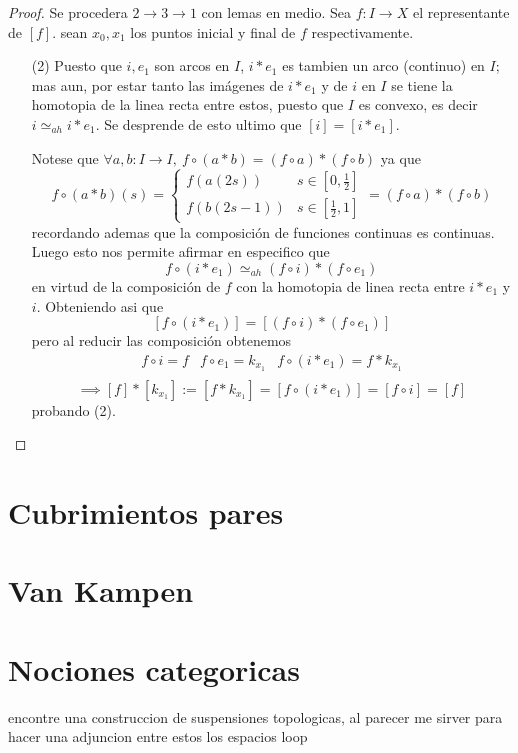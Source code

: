 \documentclass[letterpaper]{article}
\theoremstyle{definition}
\theoremstyle{plain}
\theoremstyle{plain}
\theoremstyle{remark}
\begin{document}
\begin{proof}
  Se procedera \(2 \to 3 \to 1\) con lemas en medio. Sea \(f : I \to X\)
el representante de \([f]\). sean \(x_0, x_1\) los puntos inicial y final
de \(f\) respectivamente.

\begin{itemize}
\item[(2)] Puesto que \(i,e_1\) son arcos en \(I\), \(i * e_1\) es
  tambien un arco (continuo) en \(I\); mas aun, por estar tanto las
imágenes de \(i * e_1\) y de \(i\) en \(I\) se tiene la homotopia de la
linea recta entre estos, puesto que \(I\) es convexo, es decir \(i
\simeq_{ah} i * e_1\). Se desprende de esto ultimo que \( [i] = [i *
e_1]\).

Notese que \(\forall a,b : I \to I,\ f \circ (a * b) = (f \circ a) * (f
\circ b) \) ya que
\[ f \circ (a*b) (s) =
  \begin{cases}
    f (a(2s)) & s \in [0,\frac{1}{2}] \\
    f (b(2s - 1)) & s \in [\frac{1}{2} , 1]
  \end{cases}
   = (f \circ a) * (f \circ b)\]
recordando ademas que la composición de funciones continuas es continuas.
Luego esto nos permite afirmar en especifico que
\[ f \circ (i * e_1) \simeq_{ah} (f \circ i) * (f \circ e_1) \]
en virtud de la composición de \(f\) con la homotopia de linea recta
entre \(i * e_1 \) y \(i\). Obteniendo asi que
\[ [f \circ (i * e_1)] = [(f \circ i) * (f \circ e_1)] \]
pero al reducir las composición obtenemos
\[
  \begin{matrix}
    f \circ i = f & f \circ e_1 = k_{x_1} & f \circ (i * e_1) = f *
    k_{x_{1}} \\
  \end{matrix}
\]
\[ \implies [f] * [k_{x_1}] := [f * k_{x_1}] = [f \circ (i * e_1)] = [ f
  \circ i] = [f] \]
probando (2).
\end{itemize}
\end{proof}

\section{Cubrimientos pares}

\section{Van Kampen}

\section{Nociones categoricas}
encontre una construccion de suspensiones topologicas, al parecer me
sirver para hacer una adjuncion entre estos los espacios loop
\end{document}
